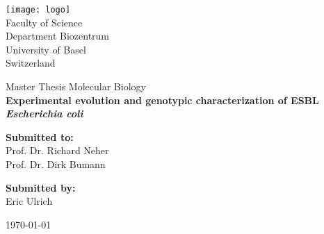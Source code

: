 \documentclass[12pt,twoside]{report}
\begin{document}
\begin{titlepage}
	\begin{center}
		\texttt{[image: logo]}\\
		\vspace{1cm}
		\Large
		Faculty of Science \\
		Department Biozentrum\\
		University of Basel\\
		Switzerland\\
		\date{\today}
		\vspace*{1cm}
		
		\Huge
		Master Thesis Molecular Biology \\
		\vspace{2cm}
		\Huge
		\textbf{Experimental evolution and genotypic characterization of ESBL \textit{Escherichia coli}}
		
		\vspace{3cm}
		\begin{minipage}[t]{0.47\textwidth}
			\textnormal{\large{\bf Submitted to:\\}}
			{\large Prof. Dr. Richard Neher\\ Prof. Dr. Dirk Bumann}
		\end{minipage}\hfill\begin{minipage}[t]{0.47\textwidth}\raggedleft
			\textnormal{\large{\bf Submitted by:\\}}
			{\large Eric Ulrich}
		\end{minipage}			
		\vspace{3.5cm}
		\newline 
		\large{\today}

		
		
	\end{center}
\end{titlepage}
\end{document}
